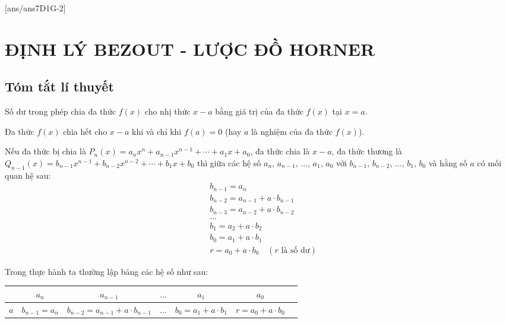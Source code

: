 [ans/ans7D1G-2]
\section{ĐỊNH LÝ BEZOUT - LƯỢC ĐỒ HORNER}
\subsection{Tóm tắt lí thuyết}
\begin{dl}
Số dư trong phép chia đa thức $f(x)$ cho nhị thức $x-a$ bằng giá trị của đa thức $f(x)$ tại $x=a$.
\end{dl}

\begin{hq}
Đa thức $f(x)$ chia hết cho $x-a$ khi và chỉ khi $f(a)=0$ (hay $a$ là nghiệm của đa thức $f(x)$).
\end{hq}

\begin{dl}
Nếu đa thức bị chia là $P_n(x)=a_nx^n+a_{n-1}x^{n-1}+\dotsb +a_1x+a_0$, đa thức chia là $x-a$, đa thức thương là $Q_{n-1}(x)=b_{n-1}x^{n-1}+b_{n-2}x^{n-2}+\dotsb +b_1x+b_0$ thì giữa các hệ số $a_n$, $a_{n-1}$, $\dotsc$, $a_1$, $a_0$ với $b_{n-1}$, $b_{n-2}$, $\dotsc$, $b_1$, $b_0$ và hằng số $a$ có mối quan hệ sau:
\begin{align*}
&b_{n-1}=a_n\\ 
& b_{n-2}=a_{n-1}+a \cdot b_{n-1}\\
& b_{n-3}=a_{n-2}+a \cdot b_{n-2}\\
& \dotsc\\
&b_1=a_2+a \cdot b_2\\
&b_0=a_1+a \cdot b_1\\
&r=a_0+a \cdot b_0 \quad (\text{$r$ là số dư}) 
\end{align*}
\end{dl}
Trong thực hành ta thường lập bảng các hệ số như sau:
\begin{center}
				\begin{tabular}{|c|c|c|c|c|c|c|}
					\hline 
  &$ a_n$& $ a_{n-1} $&  $ \dotsc $ & $a_1 $ & $ a_0 $  \\ 
					\hline 
 $ a $  & $ b_{n-1}=a_n $ &$ b_{n-2}=a_{n-1}+a \cdot b_{n-1}$&  $ \dotsc $ & $ b_0=a_1+a \cdot b_1 $ &$r=a_0+a \cdot b_0 $ \\ 
					\hline 
				\end{tabular} 	
			\end{center}

